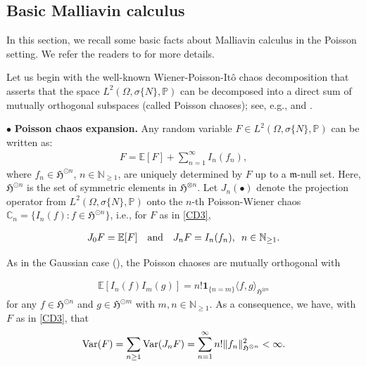 \documentclass[letterpaper, 11pt,  reqno]{amsart}
\newcommand{\noi}{\noindent}
\newcommand{\C}{\mathbb{C}}
\newcommand{\bul}{\bullet}
\newcommand{\E}{\mathbb{E}}
\newcommand{\s}{\sigma}
\renewcommand{\O}{\Omega}
\newcommand{\ind}{\mathbf 1}
\newcommand{\N}{\mathbb{N}}
\newcommand{\fm}{\mathfrak{m}}
\newcommand{\fH}{\mathfrak{H}}
\numberwithin{equation}{section}
\numberwithin{theorem}{section}
\begin{document}
\subsection{Basic Malliavin calculus} \label{SEC2_2}

 
In this section, we recall some basic facts about Malliavin calculus in the Poisson setting. 
 We refer the readers to \cite{PSTU10, Last16,LPS16,LP18, NN18} for more details.


\smallskip


Let us begin with the well-known Wiener-Poisson-It\^o chaos decomposition
that asserts that the space $L^2(\O,\s\{N\},\mathbb{P})$ can be 
decomposed into a direct sum of mutually orthogonal subspaces (called 
Poisson chaoses); see, e.g., \cite[Section 18.4]{LP18}
and \cite[Section 9.9]{NN18}.

\smallskip

\noi
$\bullet$ {\bf Poisson chaos expansion.}
Any random variable $F\in L^2(\O,\s\{N\},\mathbb{P})$ can be written as:
\begin{align}
 F = \E[F] + \sum_{n=1}^\infty I_n( f_n),
 \label{CD3}
 \end{align}
 where $f_n\in \fH^{\odot n}$, $n\in\N_{\geq 1}$, are uniquely determined by $F$
 up to a $\fm$-null set.
 Here, $\fH^{\odot n}$ is the set of symmetric elements in $\fH^{\otimes n}$.
Let $J_n(\bul)$ denote the projection operator from $L^2(\O,\s\{N\},\mathbb{P})$ 
onto the $n$-th Poisson-Wiener chaos $\C_n=\{ I_n(f): f\in\fH^{\odot n}\}$, 
i.e., for $F$ as in \eqref{CD3},

\noi
 \begin{align}\label{def_JK}
 J_0 F= \E[ F] \quad{\rm and}\quad J_n F =  I_n( f_n), \,\,\, n\in\N_{\geq 1}.
 \end{align}
 

\noi
As in the Gaussian case (\cite[Proposition 2.7.5]{blue}), 
the Poisson chaoses are mutually orthogonal with 

\noi
\begin{align}\label{orth_rel}
\E[ I_n(f) I_m(g)] = n! \ind_{\{n=m\}} \langle f, g \rangle_{\fH^{\otimes n}}
\end{align}
for any  $f\in\fH^{\odot n}$ and $g\in\fH^{\odot m}$ with $m,n\in\N_{\geq 1}$.
As a consequence, we have, with $F$ as in \eqref{CD3}, that 
 \begin{align}
{\rm Var}(F) = \sum_{n\geq 1} {\rm Var}( J_n F) =
  \sum_{n=1}^\infty n! \| f_n \|^2_{\fH^{\otimes n}} < \infty.
 \label{CD4}
 \end{align}
\end{document}
